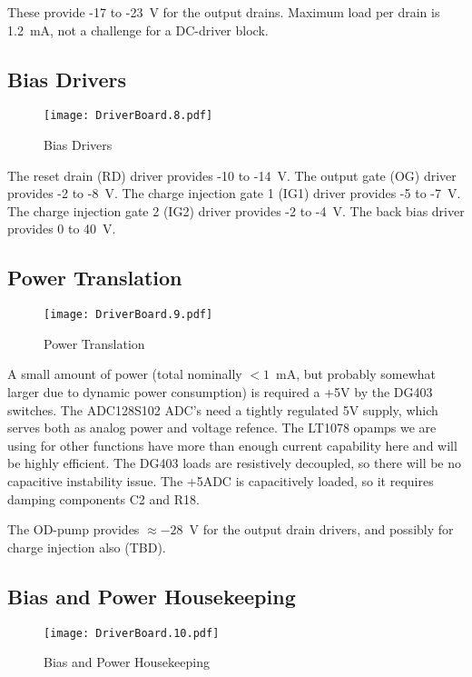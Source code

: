 These provide -17 to -23\ V for the output drains. Maximum load per drain is 1.2\ mA, not a challenge for a DC-driver block.  


\subsection{Bias Drivers}
   \begin{figure}
   \begin{center}
   \texttt{[image: DriverBoard.8.pdf]}
   \end{center}
   \caption{Bias Drivers}
   \end{figure}
  
The reset drain (RD) driver provides -10 to -14\ V. 
The output gate (OG) driver provides -2 to -8\ V.
The charge injection gate 1 (IG1) driver provides -5 to -7\ V.
The charge injection gate 2 (IG2) driver provides -2 to -4\ V.
The back bias driver provides 0 to 40\ V.


\subsection{Power Translation}
   \begin{figure}
   \begin{center}
   \texttt{[image: DriverBoard.9.pdf]}
   \end{center}
   \caption{Power Translation}
   \end{figure}
  
A small amount of power (total nominally $<1$\ mA, but probably somewhat larger due to dynamic power consumption) is required a +5V by the DG403 switches. The ADC128S102 ADC's need a tightly regulated 5V supply, which serves both as analog power and voltage refence. The LT1078 opamps we are using for other functions have more than enough current capability here and will be highly efficient. The DG403 loads are resistively decoupled, so there will be no capacitive instability issue. The +5ADC is capacitively loaded, so it requires damping components C2 and R18.

  
The OD-pump provides $\approx -28$\ V for the output drain drivers, and possibly for charge injection also (TBD).

\subsection{Bias and Power Housekeeping}
   \begin{figure}
   \begin{center}
   \texttt{[image: DriverBoard.10.pdf]}
   \end{center}
   \caption{Bias and Power Housekeeping}
   \end{figure}

